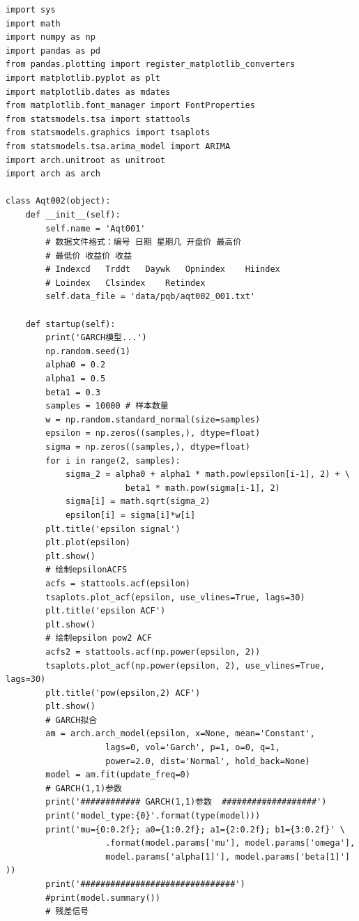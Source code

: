 \documentclass{article}
\begin{document}
\begin{lstlisting}
import sys
import math
import numpy as np
import pandas as pd
from pandas.plotting import register_matplotlib_converters
import matplotlib.pyplot as plt
import matplotlib.dates as mdates
from matplotlib.font_manager import FontProperties
from statsmodels.tsa import stattools
from statsmodels.graphics import tsaplots
from statsmodels.tsa.arima_model import ARIMA
import arch.unitroot as unitroot
import arch as arch

class Aqt002(object):
    def __init__(self):
        self.name = 'Aqt001'
        # 数据文件格式：编号 日期 星期几 开盘价 最高价 
        # 最低价 收益价 收益
        # Indexcd	Trddt	Daywk	Opnindex	Hiindex	
        # Loindex	Clsindex	Retindex
        self.data_file = 'data/pqb/aqt002_001.txt'
        
    def startup(self):
        print('GARCH模型...')
        np.random.seed(1)
        alpha0 = 0.2
        alpha1 = 0.5
        beta1 = 0.3
        samples = 10000 # 样本数量
        w = np.random.standard_normal(size=samples)
        epsilon = np.zeros((samples,), dtype=float)
        sigma = np.zeros((samples,), dtype=float)
        for i in range(2, samples):
            sigma_2 = alpha0 + alpha1 * math.pow(epsilon[i-1], 2) + \
                        beta1 * math.pow(sigma[i-1], 2)
            sigma[i] = math.sqrt(sigma_2)
            epsilon[i] = sigma[i]*w[i]
        plt.title('epsilon signal')
        plt.plot(epsilon)
        plt.show()
        # 绘制epsilonACFS
        acfs = stattools.acf(epsilon)
        tsaplots.plot_acf(epsilon, use_vlines=True, lags=30)
        plt.title('epsilon ACF')
        plt.show()
        # 绘制epsilon pow2 ACF
        acfs2 = stattools.acf(np.power(epsilon, 2))
        tsaplots.plot_acf(np.power(epsilon, 2), use_vlines=True, lags=30)
        plt.title('pow(epsilon,2) ACF')
        plt.show()
        # GARCH拟合
        am = arch.arch_model(epsilon, x=None, mean='Constant', 
                    lags=0, vol='Garch', p=1, o=0, q=1, 
                    power=2.0, dist='Normal', hold_back=None)
        model = am.fit(update_freq=0)
        # GARCH(1,1)参数
        print('############ GARCH(1,1)参数  ###################')
        print('model_type:{0}'.format(type(model)))
        print('mu={0:0.2f}; a0={1:0.2f}; a1={2:0.2f}; b1={3:0.2f}' \
                    .format(model.params['mu'], model.params['omega'], 
                    model.params['alpha[1]'], model.params['beta[1]']   ))
        print('###############################')
        #print(model.summary())
        # 残差信号

\end{lstlisting}
\end{document}
